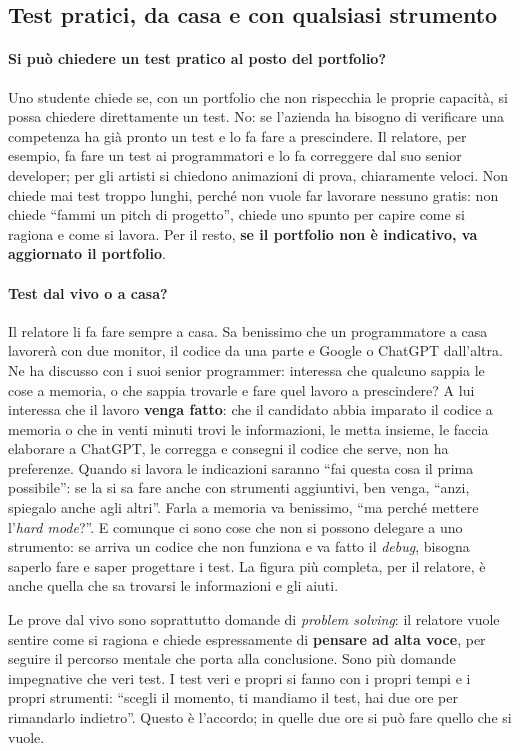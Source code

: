\subsection{Test pratici, da casa e con qualsiasi strumento}

\paragraph{Si può chiedere un test pratico al posto del portfolio?} Uno
studente chiede se, con un portfolio che non rispecchia le proprie capacità, si
possa chiedere direttamente un test. No: se l'azienda ha bisogno di verificare
una competenza ha già pronto un test e lo fa fare a prescindere. Il relatore,
per esempio, fa fare un test ai programmatori e lo fa correggere dal suo senior
developer; per gli artisti si chiedono animazioni di prova, chiaramente veloci.
Non chiede mai test troppo lunghi, perché non vuole far lavorare nessuno gratis:
non chiede ``fammi un pitch di progetto'', chiede uno spunto per capire come si
ragiona e come si lavora. Per il resto, \textbf{se il portfolio non è
indicativo, va aggiornato il portfolio}.

\paragraph{Test dal vivo o a casa?} Il relatore li fa fare sempre a casa. Sa
benissimo che un programmatore a casa lavorerà con due monitor, il codice da
una parte e Google o ChatGPT dall'altra. Ne ha discusso con i suoi senior
programmer: interessa che qualcuno sappia le cose a memoria, o che sappia
trovarle e fare quel lavoro a prescindere? A lui interessa che il lavoro
\textbf{venga fatto}: che il candidato abbia imparato il codice a memoria o che
in venti minuti trovi le informazioni, le metta insieme, le faccia elaborare a
ChatGPT, le corregga e consegni il codice che serve, non ha preferenze. Quando
si lavora le indicazioni saranno ``fai questa cosa il prima possibile'': se la
si sa fare anche con strumenti aggiuntivi, ben venga, ``anzi, spiegalo anche
agli altri''. Farla a memoria va benissimo, ``ma perché mettere l'\emph{hard
mode}?''. E comunque ci sono cose che non si possono delegare a uno strumento:
se arriva un codice che non funziona e va fatto il \emph{debug}, bisogna
saperlo fare e saper progettare i test. La figura più completa, per il
relatore, è anche quella che sa trovarsi le informazioni e gli aiuti.

Le prove dal vivo sono soprattutto domande di \emph{problem solving}: il
relatore vuole sentire come si ragiona e chiede espressamente di \textbf{pensare
ad alta voce}, per seguire il percorso mentale che porta alla conclusione. Sono
più domande impegnative che veri test. I test veri e propri si fanno con i
propri tempi e i propri strumenti: ``scegli il momento, ti mandiamo il test, hai
due ore per rimandarlo indietro''. Questo è l'accordo; in quelle due ore si può
fare quello che si vuole.

